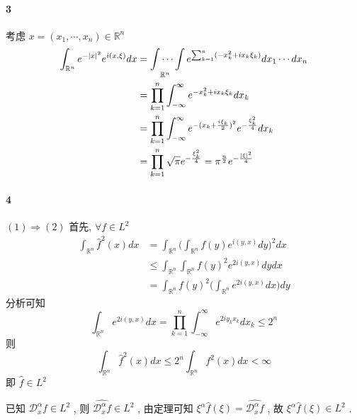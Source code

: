 \documentclass[a4paper, UTF8]{ctexart}				%
\numberwithin{equation}{section}				%
\begin{document}
    \paragraph{3}\quad
        考虑 $x = (x_1, \cdots, x_n) \in \mathbb{R}^n$
        \begin{equation*}
            \begin{split}
                \int^{}_{\mathbb{R}^n} e^{-\vert{x}\vert^2} e^{i(x, \xi)} dx
                & = \idotsint\limits_{\mathbb{R}^n} e^{\sum^{n}_{k = 1}(-x_k^2 + i x_k \xi_k)} dx_1 \cdots dx_n\\
                & = \prod^{n}_{k = 1} \int^{\infty}_{-\infty} e^{-x_k^2 + i x_k \xi_k} dx_k\\
                & = \prod^{n}_{k = 1} \int^{\infty}_{-\infty} e^{-(x_k + \frac{i \xi_k}{2})^2} e^{-\frac{\xi_k^2}{4}} dx_k\\
                & = \prod^{n}_{k = 1} \sqrt{\pi} e^{-\frac{\xi_k^2}{4}}
                  = \pi^{\frac{n}{2}} e^{-\frac{\vert{\xi}\vert^2}{4}}
            \end{split}
        \end{equation*}

    \paragraph{4}\quad
        $(1) \Rightarrow (2)$ 首先, $\forall f \in L^2$ 
        \begin{equation*}
            \begin{split}
                \int^{}_{\mathbb{R}^n} \hat{f}^2(x) dx
                & = \int^{}_{\mathbb{R}^n} \Bigg(\int^{}_{\mathbb{R}^n} f(y) e^{i(y,x)} dy\Bigg)^2 dx\\
                & \le \int^{}_{\mathbb{R}^n} \int^{}_{\mathbb{R}^n} f(y)^2 e^{2i(y,x)} dy dx\\
                & = \int^{}_{\mathbb{R}^n} f(y)^2 \Bigg(\int^{}_{\mathbb{R}^n} e^{2i(y,x)} dx\Bigg) dy
            \end{split}
        \end{equation*}
        分析可知
        \[
            \int^{}_{\mathbb{R}^n} e^{2i(y,x)} dx = \prod^{n}_{k = 1} \int^{\infty}_{-\infty} e^{2iy_k x_k} dx_k \le 2^n
        \]
        则
        \[
            \int^{}_{\mathbb{R}^n} \hat{f}^2(x) dx \le 2^n \int^{}_{\mathbb{R}^n} f^2(x) dx < \infty
        \]
        即 $\hat{f} \in L^2$

        已知 $\mathcal{D}^\alpha_x f \in L^2$ , 则 $\widehat{\mathcal{D}^\alpha_x f} \in L^2$ , 由定理可知 $\xi^\alpha \hat{f}(\xi) = \widehat{\mathcal{D}^\alpha_x f}$ , 故 $\xi^\alpha \hat{f}(\xi) \in L^2$ .
\end{document}
